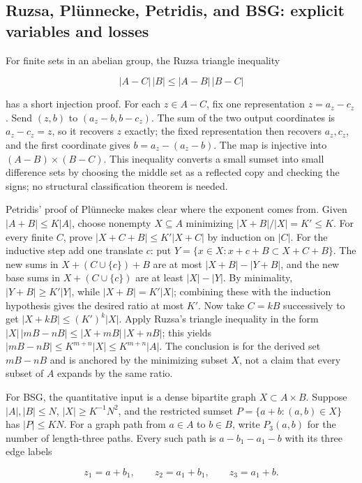 \subsection{Ruzsa, Plünnecke, Petridis, and BSG: explicit variables and losses}\label{04-visual-computing-ii-ch033-ruzsa-pluxfcnnecke-petridis-and-bsg-explicit-variables-and-losses}

For finite sets in an abelian group, the Ruzsa triangle inequality

\[|A-C|\,|B|\le |A-B|\,|B-C|\]

has a short injection proof. For each \(z\in A-C\), fix one representation \(z=a_z-c_z\). Send \((z,b)\) to \((a_z-b,b-c_z)\). The sum of the two output coordinates is \(a_z-c_z=z\), so it recovers \(z\) exactly; the fixed representation then recovers \(a_z,c_z\), and the first coordinate gives \(b=a_z-(a_z-b)\). The map is injective into \((A-B)\times(B-C)\). This inequality converts a small sumset into small difference sets by choosing the middle set as a reflected copy and checking the signs; no structural classification theorem is needed.

Petridis' proof of Plünnecke makes clear where the exponent comes from. Given \(|A+B|\le K|A|\), choose nonempty \(X\subseteq A\) minimizing \(|X+B|/|X|=K' \le K\). For every finite \(C\), prove \(|X+C+B|\le K'|X+C|\) by induction on \(|C|\). For the inductive step add one translate \(c\): put \(Y=\{x\in X:x+c+B\subset X+C+B\}\). The new sums in \(X+(C\cup\{c\})+B\) are at most \(|X+B|-|Y+B|\), and the new base sums in \(X+(C\cup\{c\})\) are at least \(|X|-|Y|\). By minimality, \(|Y+B|\ge K'|Y|\), while \(|X+B|=K'|X|\); combining these with the induction hypothesis gives the desired ratio at most \(K'\). Now take \(C=kB\) successively to get \(|X+kB|\le(K')^k|X|\). Apply Ruzsa's triangle inequality in the form \(|X|\,|mB-nB|\le|X+mB|\,|X+nB|\); this yields \(|mB-nB|\le K^{m+n}|X|\le K^{m+n}|A|\). The conclusion is for the derived set \(mB-nB\) and is anchored by the minimizing subset \(X\), not a claim that every subset of \(A\) expands by the same ratio.

For BSG, the quantitative input is a dense bipartite graph \(X\subset A\times B\). Suppose \(|A|,|B|\le N\), \(|X|\ge K^{-1}N^2\), and the restricted sumset \(P=\{a+b:(a,b)\in X\}\) has \(|P|\le KN\). For a graph path from \(a\in A\) to \(b\in B\), write \(P_3(a,b)\) for the number of length-three paths. Every such path is \(a-b_1-a_1-b\) with its three edge labels

\[z_1=a+b_1,\qquad z_2=a_1+b_1,\qquad z_3=a_1+b.\]

